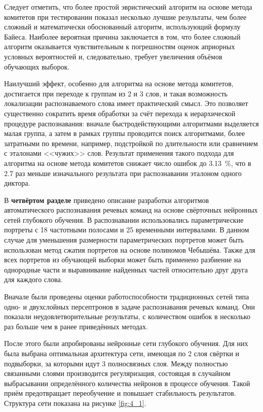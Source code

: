 Следует отметить, что более простой эвристический алгоритм на основе метода комитетов при тестировании показал несколько лучшие результаты, чем более сложный и математически обоснованный алгоритм, использующий формулу Байеса.
Наиболее вероятная причина заключается в том, что более сложный алгоритм оказывается чувствительным к погрешностям оценок априорных условных вероятностей и, следовательно, требует увеличения объёмов обучающих выборок.

Наилучший эффект, особенно для алгоритма на основе метода комитетов, достигается при переходе к группам из 2 и 3 слов, и такая возможность локализации распознаваемого слова имеет практический смысл.
Это позволяет существенно сократить время обработки за счёт перехода к иерархической процедуре распознавания: вначале быстродействующими алгоритмами выделяется малая группа, а затем в рамках группы проводится поиск алгоритмами, более затратными по времени, например, подстройкой по длительности или сравнением с эталонами <<чужих>> слов.
Результат применения такого подхода для алгоритма на основе метода комитетов снижает число ошибок до 3.13~\%, что в 2.7 раз меньше изначального результата при распознавании эталоном одного диктора.


В \textbf{четвёртом разделе} приведено описание разработки алгоритмов автоматического распознавания речевых команд на основе свёрточных нейронных сетей глубокого обучения.
В распознавании использовались параметрические портреты с 18 частотными полосами и 25 временными интервалами.
В данном случае для уменьшения размерности параметрических портретов может быть использован метод сжатия портретов на основе полиномов Чебышёва.
Также для всех портретов из обучающей выборки может быть применено разбиение на однородные части и выравнивание найденных частей относительно друг друга для каждого слова.

Вначале были проведены оценки работоспособности традиционных сетей типа одно- и двухслойных персептронов в задаче распознавания речевых команд.
Они показали неудовлетворительные результаты, с количеством ошибок в несколько раз больше чем в ранее приведённых методах.

После этого были апробированы нейронные сети глубокого обучения.
Для них была выбрана оптимальная архитектура сети, имеющая по 2 слоя свёртки и подвыборки, за которыми идут 3 полносвязных слоя.
Между полностью связанными слоями производится регуляризация, состоящая в случайном выбрасывании определённого количества нейронов в процессе обучения.
Такой приём предотвращает переобучение и повышает стабильность результатов.
Структура сети показана на рисунке \ref{fig:4_1}.

